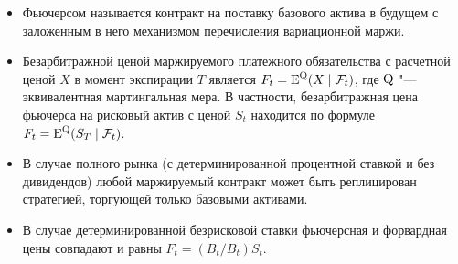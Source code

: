 




\summary
\begin{itemize}
\item Фьючерсом называется контракт на поставку базового актива в будущем с заложенным в него механизмом перечисления вариационной маржи. 

\item Безарбитражной ценой маржируемого платежного обязательства с расчетной ценой $X$ в момент экспирации $T$ является $F_t=\operatorname{E}^{\mathrm{Q}}(X\mid \mathcal{F}_t)$, где $\mathrm{Q}$ "--- эквивалентная мартингальная мера.
В частности, безарбитражная цена фьючерса на рисковый актив с ценой $S_t$ находится по формуле $F_t = \operatorname{E}^{\mathrm{Q}}(S_T\mid \mathcal{F}_t)$.

\item В случае полного рынка (с детерминированной процентной ставкой и без дивидендов) любой маржируемый контракт может быть реплицирован стратегией, торгующей только базовыми активами.

\item В случае детерминированной безрисковой ставки фьючерсная и форвардная цены совпадают и равны $F_t=(B_t/B_t)S_t$.
\end{itemize}
